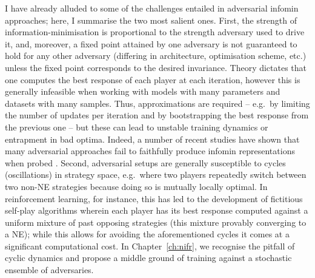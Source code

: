 I have already alluded to some of the challenges entailed in adversarial infomin
approaches; here, I summarise the two most salient ones.
%
%
First, the strength of information-minimisation is proportional to the strength adversary used to
drive it, and, moreover, a fixed point attained by one adversary is not guaranteed to hold for any
other adversary (differing in architecture, optimisation scheme, etc.) unless the fixed point
corresponds to the desired invariance. 
%
Theory dictates that one computes the best response of each player at each iteration, however this
is generally infeasible when working with models with many parameters and datasets with many
samples. 
%
Thus, approximations are required -- e.g.\ by limiting the number of updates per iteration and by
bootstrapping the best response from the previous one -- but these can lead to unstable training
dynamics or entrapment in bad optima. 
%
Indeed, a number of recent studies have shown that many adversarial approaches fail to faithfully
produce infomin representations when probed \citep{moyer2018invariant, feng2019learning,
balunovic2021fair}.
%
%
Second, adversarial setups are generally susceptible to cycles (oscillations) in strategy space,
e.g.\ where two players repeatedly switch between two non-NE strategies because doing so is
mutually locally optimal. 
%
In reinforcement learning, for instance, this has led to the development of fictitious self-play
algorithms \citep{brown1951iterative, heinrich2015fictitious, vinyals2019grandmaster} wherein each
player has its best response computed against a uniform mixture of past opposing strategies (this
mixture provably converging to a NE); while this allows for avoiding the aforementioned cycles it
comes at a significant computational cost.
%
In Chapter~\ref{ch:nifr}, we recognise the pitfall of cyclic dynamics and propose a middle ground
of training against a stochastic ensemble of adversaries.
% 




